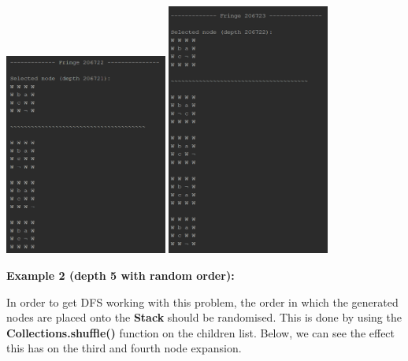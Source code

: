 \documentclass{article}
\begin{document}
	\begin{multicols}{2}[\columnsep=2cm]
		\includegraphics[width=0.4\textwidth,keepaspectratio]{DFS-1-5.png}
		\columnbreak
		\includegraphics[width=0.4\textwidth,keepaspectratio]{DFS-1-6.png}
	\end{multicols}

	\newpage
	\textbf{Example 2 (depth 5 with random order):}
	
	In order to get DFS working with this problem, the order in which the generated nodes are placed onto the \textbf{Stack} should be randomised. This is done by using the \textbf{Collections.shuffle()} function on the children list. Below, we can see the effect this has on the third and fourth node expansion.
	
\end{document}
